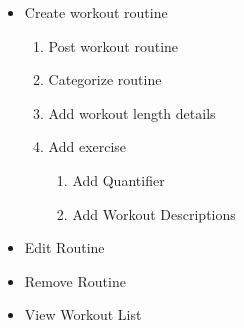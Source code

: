 \documentclass[12pt]{article}
\begin{document}
\begin{itemize}
	
	\item Create workout routine
	\begin{enumerate}
		\item Post workout routine
		\item Categorize routine
		\item Add workout length details
		\item Add exercise 
		\begin{enumerate}
			\item Add Quantifier
			\item Add Workout Descriptions
		\end{enumerate}
	\end{enumerate}
	
	\item Edit Routine
	\item Remove Routine
	\item View Workout List
\end{itemize}
\end{document}
